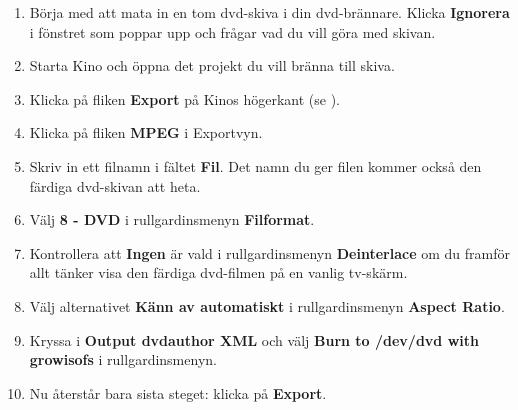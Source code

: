 \documentclass[a4paper,final]{memoir} %
\begin{document}
\begin{enumerate}

\item Börja med att mata in en tom dvd-skiva i din dvd-brännare. Klicka \textbf{Ignorera} i fönstret som poppar upp och frågar vad du vill göra med skivan.

\item Starta Kino och öppna det projekt du vill bränna till skiva. 

\item Klicka på fliken \textbf{Export} på Kinos högerkant (se ).	

\item Klicka på fliken \textbf{MPEG} i Exportvyn.

\item Skriv in ett filnamn i fältet \textbf{Fil}. Det namn du ger filen kommer också den färdiga dvd-skivan att heta.

\item Välj \textbf{8 - DVD} i rullgardinsmenyn \textbf{Filformat}.

\item Kontrollera att \textbf{Ingen} är vald i rullgardinsmenyn \textbf{Deinterlace} om du framför allt tänker visa den färdiga dvd-filmen på en vanlig tv-skärm.

\xnegskip{}

\item Välj alternativet \textbf{Känn av automatiskt} i rullgardinsmenyn \textbf{Aspect Ratio}.

\item Kryssa i \textbf{Output dvdauthor XML} och välj \textbf{Burn to /dev/dvd with growisofs} i rullgardinsmenyn.

\item Nu återstår bara sista steget: klicka på \textbf{Export}. 

\xnegskip{}

\end{enumerate}
\end{document}
